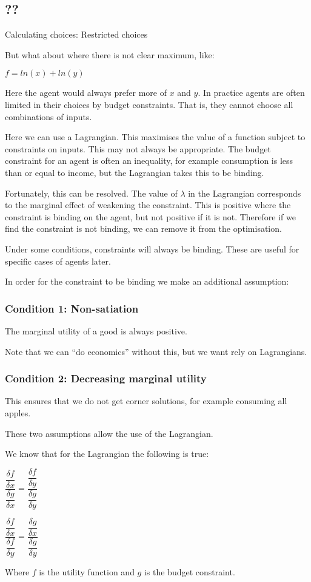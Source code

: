 
\subsection{??}

Calculating choices: Restricted choices

But what about where there is not clear maximum, like:

\(f=ln(x)+ln(y)\)

Here the agent would always prefer more of \(x\) and \(y\). In practice agents are often limited in their choices by budget constraints. That is, they cannot choose all combinations of inputs.

Here we can use a Lagrangian. This maximises the value of a function subject to constraints on inputs. This may not always be appropriate. The budget constraint for an agent is often an inequality, for example consumption is less than or equal to income, but the Lagrangian takes this to be binding.

Fortunately, this can be resolved. The value of \(\lambda \) in the Lagrangian corresponds to the marginal effect of weakening the constraint. This is positive where the constraint is binding on the agent, but not positive if it is not. Therefore if we find the constraint is not binding, we can remove it from the optimisation.

Under some conditions, constraints will always be binding. These are useful for specific cases of agents later.

In order for the constraint to be binding we make an additional assumption:

\subsubsection{Condition 1: Non-satiation}

The marginal utility of a good is always positive.

Note that we can “do economics” without this, but we want rely on Lagrangians.

\subsubsection{Condition 2: Decreasing marginal utility}

This ensures that we do not get corner solutions, for example consuming all apples.

These two assumptions allow the use of the Lagrangian.

We know that for the Lagrangian the following is true:

\(\dfrac{\dfrac{\delta f}{\delta x}}{\dfrac{\delta g}{\delta x}}=\dfrac{\dfrac{\delta f}{\delta y}}{\dfrac{\delta g}{\delta y}}\)

\(\dfrac{\dfrac{\delta f}{\delta x}}{\dfrac{\delta f}{\delta y}}=\dfrac{\dfrac{\delta g}{\delta x}}{\dfrac{\delta g}{\delta y}}\)

Where \(f\) is the utility function and \(g\) is the budget constraint.

